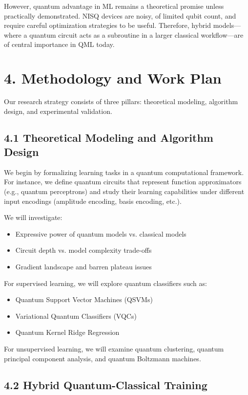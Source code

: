 \documentclass[11pt]{article}
\begin{document}
However, quantum advantage in ML remains a theoretical promise unless practically demonstrated. NISQ devices are noisy, of limited qubit count, and require careful optimization strategies to be useful. Therefore, hybrid models—where a quantum circuit acts as a subroutine in a larger classical workflow—are of central importance in QML today.

\section*{4. Methodology and Work Plan}

Our research strategy consists of three pillars: theoretical modeling, algorithm design, and experimental validation.

\subsection*{4.1 Theoretical Modeling and Algorithm Design}

We begin by formalizing learning tasks in a quantum computational framework. For instance, we define quantum circuits that represent function approximators (e.g., quantum perceptrons) and study their learning capabilities under different input encodings (amplitude encoding, basis encoding, etc.).

We will investigate:
\begin{itemize}
    \item Expressive power of quantum models vs. classical models
    \item Circuit depth vs. model complexity trade-offs
    \item Gradient landscape and barren plateau issues \cite{mcclean2018}
\end{itemize}

For supervised learning, we will explore quantum classifiers such as:
\begin{itemize}
    \item Quantum Support Vector Machines (QSVMs)
    \item Variational Quantum Classifiers (VQCs)
    \item Quantum Kernel Ridge Regression
\end{itemize}

For unsupervised learning, we will examine quantum clustering, quantum principal component analysis, and quantum Boltzmann machines.

\subsection*{4.2 Hybrid Quantum-Classical Training}
\end{document}

